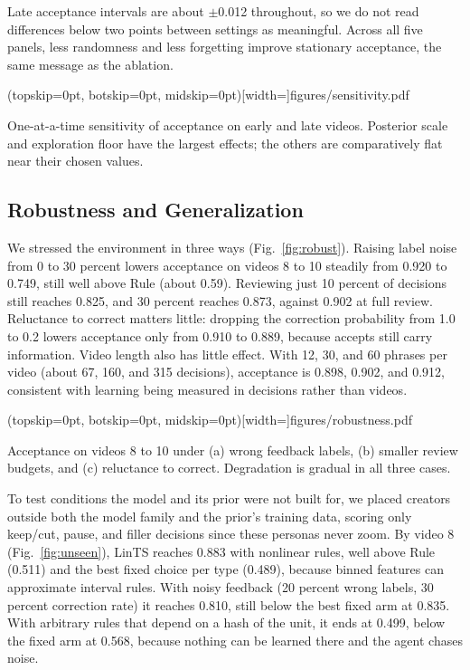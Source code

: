 \documentclass{ieeeaccess}
\begin{document}
Late acceptance intervals are about $\pm$0.012 throughout, so we do not read differences below two points between settings as meaningful. Across all five panels, less randomness and less forgetting improve stationary acceptance, the same message as the ablation.

\Figure[t!](topskip=0pt, botskip=0pt, midskip=0pt)[width=\textwidth]{figures/sensitivity.pdf}
{\parbox[t]{0.91\textwidth}{\raggedright One-at-a-time sensitivity of acceptance on early and late videos. Posterior scale and exploration floor have the largest effects; the others are comparatively flat near their chosen values.}\label{fig:sensitivity}}

\subsection{Robustness and Generalization}
We stressed the environment in three ways (Fig.~\ref{fig:robust}). Raising label noise from 0 to 30 percent lowers acceptance on videos 8 to 10 steadily from 0.920 to 0.749, still well above Rule (about 0.59). Reviewing just 10 percent of decisions still reaches 0.825, and 30 percent reaches 0.873, against 0.902 at full review. Reluctance to correct matters little: dropping the correction probability from 1.0 to 0.2 lowers acceptance only from 0.910 to 0.889, because accepts still carry information. Video length also has little effect. With 12, 30, and 60 phrases per video (about 67, 160, and 315 decisions), acceptance is 0.898, 0.902, and 0.912, consistent with learning being measured in decisions rather than videos.

\Figure[t!](topskip=0pt, botskip=0pt, midskip=0pt)[width=\textwidth]{figures/robustness.pdf}
{\parbox[t]{0.91\textwidth}{\raggedright Acceptance on videos 8 to 10 under (a) wrong feedback labels, (b) smaller review budgets, and (c) reluctance to correct. Degradation is gradual in all three cases.}\label{fig:robust}}

To test conditions the model and its prior were not built for, we placed creators outside both the model family and the prior's training data, scoring only keep/cut, pause, and filler decisions since these personas never zoom. By video 8 (Fig.~\ref{fig:unseen}), LinTS reaches 0.883 with nonlinear rules, well above Rule (0.511) and the best fixed choice per type (0.489), because binned features can approximate interval rules. With noisy feedback (20 percent wrong labels, 30 percent correction rate) it reaches 0.810, still below the best fixed arm at 0.835. With arbitrary rules that depend on a hash of the unit, it ends at 0.499, below the fixed arm at 0.568, because nothing can be learned there and the agent chases noise.
\end{document}
